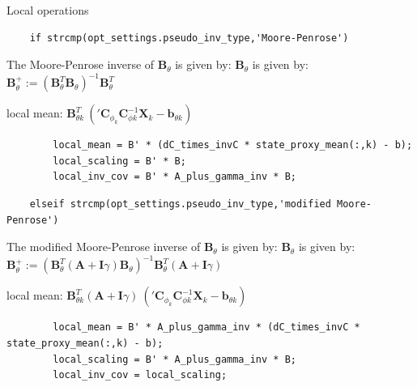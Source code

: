 \color{black}
\begin{par}
Local operations
\end{par} \vspace{1em}
\color{RoyalPurple}\begin{verbatim}
    if strcmp(opt_settings.pseudo_inv_type,'Moore-Penrose')
\end{verbatim}
\color{black}
\begin{par}
The Moore-Penrose inverse of $\mathbf{B}_{\theta}$ is given by: $\mathbf{B}_{\theta}$ is given by: $\mathbf{B}_{\theta}^+ := \left(\mathbf{B}_{\theta}^T \mathbf{B}_{\theta} \right)^{-1} \mathbf{B}_{\theta}^T$
\end{par} \vspace{1em}
\begin{par}
local mean: $\mathbf{B}_{\theta k}^T ~ \left( {'\mathbf{C}_{\phi_k}} \mathbf{C}_{\phi k}^{-1} \mathbf{X}_k - \mathbf{b}_{\theta k} \right)$
\end{par} \vspace{1em}
\color{RoyalPurple}\begin{verbatim}
        local_mean = B' * (dC_times_invC * state_proxy_mean(:,k) - b);
        local_scaling = B' * B;
        local_inv_cov = B' * A_plus_gamma_inv * B;
\end{verbatim}
\color{black}
\color{RoyalPurple}\begin{verbatim}
    elseif strcmp(opt_settings.pseudo_inv_type,'modified Moore-Penrose')
\end{verbatim}
\color{black}
\begin{par}
The modified Moore-Penrose inverse of $\mathbf{B}_{\theta}$ is given by: $\mathbf{B}_{\theta}$ is given by: $\mathbf{B}_{\theta}^+ := \left(\mathbf{B}_{\theta}^T (\mathbf{A} + \mathbf{I}\gamma) \mathbf{B}_{\theta} \right)^{-1} \mathbf{B}_{\theta}^T (\mathbf{A} + \mathbf{I}\gamma)$
\end{par} \vspace{1em}
\begin{par}
local mean: $\mathbf{B}_{\theta k}^T (\mathbf{A} + \mathbf{I}\gamma) ~ \left( {'\mathbf{C}_{\phi_k}} \mathbf{C}_{\phi k}^{-1} \mathbf{X}_k - \mathbf{b}_{\theta k} \right)$
\end{par} \vspace{1em}
\color{RoyalPurple}\begin{verbatim}
        local_mean = B' * A_plus_gamma_inv * (dC_times_invC * state_proxy_mean(:,k) - b);
        local_scaling = B' * A_plus_gamma_inv * B;
        local_inv_cov = local_scaling;
\end{verbatim}
